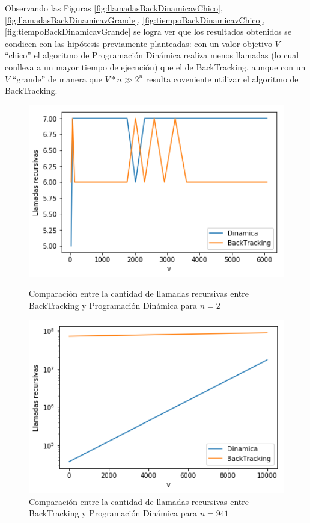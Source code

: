 Observando las Figuras \ref{fig:llamadasBackDinamicavChico}, \ref{fig:llamadasBackDinamicavGrande},
\ref{fig:tiempoBackDinamicavChico}, \ref{fig:tiempoBackDinamicavGrande} se logra
ver que los resultados obtenidos se condicen con las hip\'otesis previamente planteadas: con un valor objetivo $V$
``chico'' el algoritmo de Programaci\'on Din\'amica realiza menos llamadas (lo cual conlleva a un mayor tiempo
de ejecuci\'on) que el de BackTracking, aunque con un $V$ ``grande'' de manera que $V*n \gg 2^n$ resulta coveniente
utilizar el algoritmo de BackTracking. 
 \begin{figure}[H] 
    \centering
    \begin{minipage}{0.45\textwidth}
        \centering
        \includegraphics[width=1\textwidth]{img/llamadas/n/backDinNChico.png} %
        \caption{Comparaci\'on entre la cantidad de llamadas recursivas entre BackTracking y Programaci\'on
        Din\'amica para $n=2$}
        \label{fig:backDinNChico} 
    \end{minipage}\hfill
    \begin{minipage}{0.45\textwidth}
        \centering 
        \includegraphics[width=1\textwidth]{img/llamadas/n/backDinNGrande.png} %
        \caption{Comparaci\'on entre la cantidad de llamadas recursivas entre BackTracking y Programaci\'on
        \label{fig:backDinNGrande} 
        Din\'amica para $n=941$}
    \end{minipage}
\end{figure}

